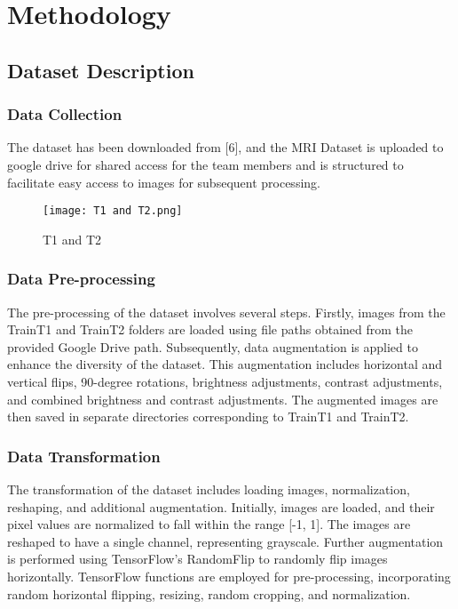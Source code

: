 \documentclass[conference]{IEEEtran}
\begin{document}
\section{Methodology}
\subsection{Dataset Description}
\subsubsection{Data Collection}
The dataset has been downloaded from [6], and the MRI Dataset is uploaded to google drive for shared access for the team members and is structured to facilitate easy access to images for subsequent processing.
\begin{figure}[!ht]
  \centering
  \texttt{[image: T1 and T2.png]}
  \captionsetup{justification=centering}
  \caption{T1 and T2}
  \label{fig:T1 and T2}
\end{figure}

\subsubsection{Data Pre-processing}
The pre-processing of the dataset involves several steps. Firstly, images from the TrainT1 and TrainT2 folders are loaded using file paths obtained from the provided Google Drive path. Subsequently, data augmentation is applied to enhance the diversity of the dataset. This augmentation includes horizontal and vertical flips, 90-degree rotations, brightness adjustments, contrast adjustments, and combined brightness and contrast adjustments. The augmented images are then saved in separate directories corresponding to TrainT1 and TrainT2.

\subsubsection{Data Transformation}
The transformation of the dataset includes loading images, normalization, reshaping, and additional augmentation. Initially, images are loaded, and their pixel values are normalized to fall within the range [-1, 1]. The images are reshaped to have a single channel, representing grayscale. Further augmentation is performed using TensorFlow's RandomFlip to randomly flip images horizontally. TensorFlow functions are employed for pre-processing, incorporating random horizontal flipping, resizing, random cropping, and normalization.
\end{document}
